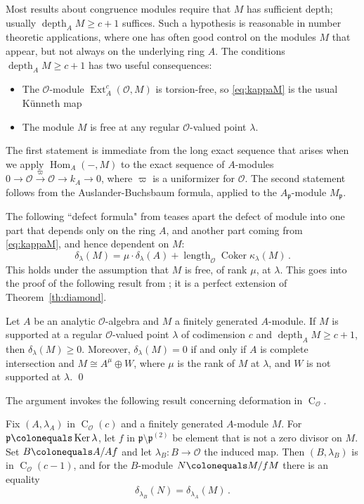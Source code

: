\documentclass[twoside,leqno]{article}
\newcommand{\cato}{\operatorname{C}}
\newcommand{\Coker}{\operatorname{Coker}}
\newcommand{\depth}{\operatorname{depth}}
\newcommand{\ext}{\operatorname{Ext}}
\newcommand{\fp}{{\mathfrak p}}
\newcommand{\Hom}{\operatorname{Hom}}
\newcommand{\Ker}{\operatorname{Ker}}
\newcommand{\length}{\operatorname{length}}
\newcommand{\mco}{\mathcal O}
\begin{document}
Most results about congruence modules require that $M$ has sufficient depth; usually $\depth_AM\ge c+1$ suffices. Such a hypothesis is reasonable in number theoretic applications, where one has often good control on the modules $M$ that appear, but not always on the underlying ring $A$.  The conditions $\depth_AM\ge c+1$ has two useful consequences:
  \begin{itemize}
      \item 
      The $\mco$-module $\ext^c_{A}(\mco,M)$ is torsion-free, so \eqref{eq:kappaM} is the usual K\"unneth map
      \item 
      The module $M$ is free at any regular $\mco$-valued point $\lambda$.
  \end{itemize}
 The first statement is immediate from the long exact sequence that arises when we apply $\Hom_A(-,M)$ to the exact sequence of $A$-modules $0\to \mco\xrightarrow{\varpi}\mco\to k_A\to 0$, where $\varpi$ is a uniformizer for $\mco$. The second statement follows from the Auslander-Buchsbaum formula, applied to the $A_\fp$-module $M_\fp$.

The following ``defect formula" from \cite[Lemma~3.7]{Iyengar/Khare/Manning:2024a} teases apart the defect of module into one part that depends only on the ring $A$, and another part coming from \eqref{eq:kappaM}, and hence dependent on $M$:
\begin{equation}
\label{eq:defect-formula}
\delta_{\lambda}(M) = \mu\cdot \delta_{\lambda}(A) + \length_{\mco}\Coker \kappa_\lambda(M)\,.     
\end{equation}
This holds under the assumption that $M$ is free, of rank $\mu$, at $\lambda$.
This goes into the proof of the following result from \cite{Iyengar/Khare/Manning:2025a}; it is a perfect extension of Theorem~\ref{th:diamond}.

\begin{theorem}
    \label{th:splitting}
Let $A$ be an analytic $\mco$-algebra and $M$ a finitely generated $A$-module.
If $M$ is supported at a regular $\mco$-valued point  $\lambda$ of codimension $c$ and $\depth_A M\ge c+1$, then
$\delta_\lambda(M)\ge 0$. Moreover, $\delta_\lambda(M)=0$ if and only if $A$ is complete intersection and $M\cong A^\mu\oplus W$, where $\mu$ is the rank of $M$ at $\lambda$, and $W$ is not supported at $\lambda$. \qed   
\end{theorem}

The argument invokes the following result concerning deformation in $\cato_\mco$.

\begin{theorem}
    \label{th:deformation}
Fix $(A,\lambda_A)$ in $\cato_\mco(c)$ and a finitely generated $A$-module $M$. For $\fp\colonequals \Ker\lambda$, let $f$ in $ \fp\setminus \fp^{(2)}$ be element that is not a zero divisor on $M$. Set $B\colonequals A/Af$ and let $\lambda_B\colon B\to \mco$ the induced map. Then $(B,\lambda_B)$ is in $\cato_{\mco}(c-1)$, and for the $B$-module $N\colonequals M/fM$ there is an equality
\[
\delta_{\lambda_B}(N) = \delta_{\lambda_A}(M) \,.
\]
\end{theorem}
\end{document}
